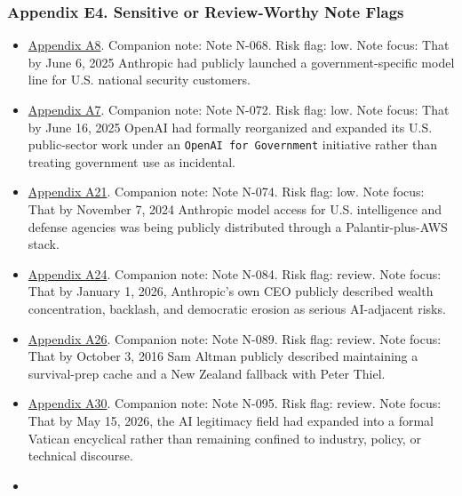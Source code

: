 \documentclass[
  american,
  11pt,
  letterpaper,
]{article}
\providecommand{\tightlist}{%
  \setlength{\itemsep}{0pt}\setlength{\parskip}{0pt}}
\begin{document}
\subsubsection{Appendix E4. Sensitive or Review-Worthy Note
Flags}\label{appendix-e4-sensitive-or-review-worthy-note-flags}

\begin{itemize}
\tightlist
\item
  \hyperref[appendix-a8-claude-gov-models-for-u-s-national-security-customers]{Appendix
  A8}. Companion note: Note N-068. Risk flag: low. Note focus: That by
  June 6, 2025 Anthropic had publicly launched a government-specific
  model line for U.S. national security customers.
\item
  \hyperref[appendix-a7-introducing-openai-for-government]{Appendix A7}.
  Companion note: Note N-072. Risk flag: low. Note focus: That by June
  16, 2025 OpenAI had formally reorganized and expanded its U.S.
  public-sector work under an \texttt{OpenAI\ for\ Government}
  initiative rather than treating government use as incidental.
\item
  \hyperref[appendix-a21-anthropic-and-palantir-partner-to-bring-claude-ai-models-to-aws-for-u-s-government-intelligence-and-defense-operations]{Appendix
  A21}. Companion note: Note N-074. Risk flag: low. Note focus: That by
  November 7, 2024 Anthropic model access for U.S. intelligence and
  defense agencies was being publicly distributed through a
  Palantir-plus-AWS stack.
\item
  \hyperref[appendix-a24-the-adolescence-of-technology]{Appendix A24}.
  Companion note: Note N-084. Risk flag: review. Note focus: That by
  January 1, 2026, Anthropic's own CEO publicly described wealth
  concentration, backlash, and democratic erosion as serious AI-adjacent
  risks.
\item
  \hyperref[appendix-a26-sam-altman-s-manifest-destiny]{Appendix A26}.
  Companion note: Note N-089. Risk flag: review. Note focus: That by
  October 3, 2016 Sam Altman publicly described maintaining a
  survival-prep cache and a New Zealand fallback with Peter Thiel.
\item
  \hyperref[appendix-a30-encyclical-letter-of-his-holiness-leo-xiv-magnifica-humanitas]{Appendix
  A30}. Companion note: Note N-095. Risk flag: review. Note focus: That
  by May 15, 2026, the AI legitimacy field had expanded into a formal
  Vatican encyclical rather than remaining confined to industry, policy,
  or technical discourse.
\item

\end{itemize}
\end{document}
